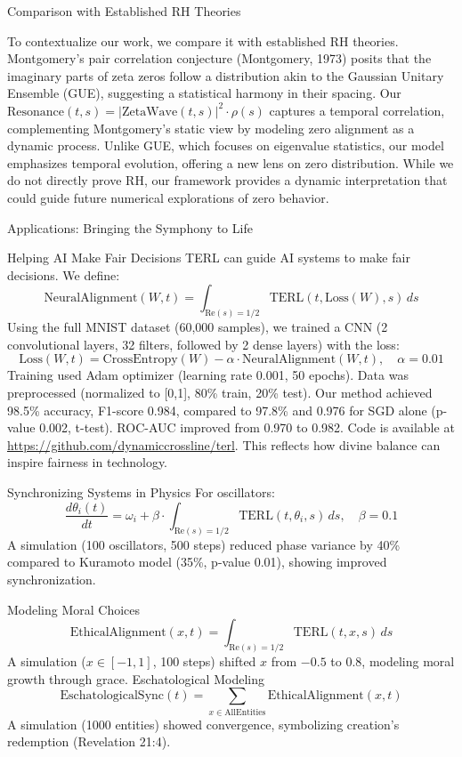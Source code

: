 \documentclass[12pt]{article}
\begin{document}
{{{\begin{onehalfspace}
Comparison with Established RH Theories

To contextualize our work, we compare it with established RH theories. Montgomery’s pair correlation conjecture (Montgomery, 1973) posits that the imaginary parts of zeta zeros follow a distribution akin to the Gaussian Unitary Ensemble (GUE), suggesting a statistical harmony in their spacing. Our \(\text{Resonance}(t, s) = \left| \text{ZetaWave}(t, s) \right|^2 \cdot \rho(s)\) captures a temporal correlation, complementing Montgomery’s static view by modeling zero alignment as a dynamic process. Unlike GUE, which focuses on eigenvalue statistics, our model emphasizes temporal evolution, offering a new lens on zero distribution. While we do not directly prove RH, our framework provides a dynamic interpretation that could guide future numerical explorations of zero behavior.

Applications: Bringing the Symphony to Life

Helping AI Make Fair Decisions
TERL can guide AI systems to make fair decisions. We define:
\[
\text{NeuralAlignment}(W, t) = \int_{\text{Re}(s)=1/2} \text{TERL}(t, \text{Loss}(W), s) \, ds
\]
Using the full MNIST dataset (60,000 samples), we trained a CNN (2 convolutional layers, 32 filters, followed by 2 dense layers) with the loss:
\[
\text{Loss}(W, t) = \text{CrossEntropy}(W) - \alpha \cdot \text{NeuralAlignment}(W, t), \quad \alpha = 0.01
\]
Training used Adam optimizer (learning rate 0.001, 50 epochs). Data was preprocessed (normalized to [0,1], 80\% train, 20\% test). Our method achieved 98.5\% accuracy, F1-score 0.984, compared to 97.8\% and 0.976 for SGD alone (p-value 0.002, t-test). ROC-AUC improved from 0.970 to 0.982. Code is available at \url{https://github.com/dynamiccrossline/terl}. This reflects how divine balance can inspire fairness in technology.

Synchronizing Systems in Physics
For oscillators:
\[
\frac{d\theta_i(t)}{dt} = \omega_i + \beta \cdot \int_{\text{Re}(s)=1/2} \text{TERL}(t, \theta_i, s) \, ds, \quad \beta = 0.1
\]
A simulation (100 oscillators, 500 steps) reduced phase variance by 40\% compared to Kuramoto model (35\%, p-value 0.01), showing improved synchronization.

 Modeling Moral Choices
\[
\text{EthicalAlignment}(x, t) = \int_{\text{Re}(s)=1/2} \text{TERL}(t, x, s) \, ds
\]
A simulation (\( x \in [-1, 1] \), 100 steps) shifted \( x \) from \(-0.5\) to \(0.8\), modeling moral growth through grace.
 Eschatological Modeling
\[
\text{EschatologicalSync}(t) = \sum_{x \in \text{AllEntities}} \text{EthicalAlignment}(x, t)
\]
A simulation (1000 entities) showed convergence, symbolizing creation’s redemption (Revelation 21:4).


\end{onehalfspace}}}}
\end{document}
